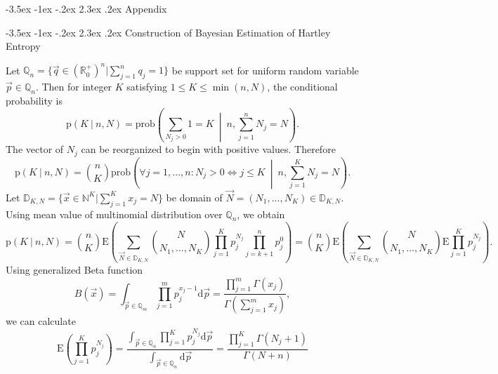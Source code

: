 \documentclass[a4paper,10pt]{article}
\makeatletter
\renewcommand\section{\@startsection {section}{1}{\z@}%
                                   {-3.5ex \@plus -1ex \@minus -.2ex}%
                                   {2.3ex \@plus.2ex}%
                                   {\large\bfseries}}
\renewcommand\subsection{\@startsection {subsection}{1}{\z@}%
                                   {-3.5ex \@plus -1ex \@minus -.2ex}%
                                   {2.3ex \@plus.2ex}%
                                   {\normalsize\bfseries}}
\makeatother
\begin{document}
\begin{appendices}

\section {Appendix}

\subsection {Construction of Bayesian Estimation of Hartley Entropy}

Let $\mathbb{Q}_{n} = \{ \vec{q} \in (\mathbb{R}_{0}^{+})^{n} | \sum_{j=1}^{n}q_{j} = 1 \}$ be support set for uniform random variable $\vec{p} \in \mathbb{Q}_{n}$. Then for integer $K$ satisfying $1 \le K \le \min(n,N)$, the conditional probability is 
\begin{equation} 
\label{eq:probpkn}
\text{p}(K \: | \: n,N) = \text{prob}\left(\sum_{N_{j}>0} 1 = K \: \middle| \: n, \sum_{j=1}^{n}N_{j} = N\right).
\end{equation}
The vector of $N_{j}$ can be reorganized to begin with positive values. Therefore
\begin{equation} 
\label{eq:probbinom}
\text{p}(K \: | \: n,N) = {n \choose K}\text{prob}\left( \forall j=1,...,n : N_{j} > 0 \Leftrightarrow j \le K \: \middle| \: n, \sum_{j=1}^{K}N_{j}=N\right).
\end{equation}
Let $\mathbb{D}_{K,N} = \{ \vec{x} \in \mathbb{N}^K | \sum_{j=1}^{K}x_{j} = N \}$ be domain of $\vec{N} = (N_{1},...,N_{K}) \in \mathbb{D}_{K,N}$. Using mean value of multinomial distribution over $\mathbb{Q}_{n}$, we obtain
\begin{equation} 
\label{eq:probbinomexp}
\text{p}(K \: | \: n,N) = {n \choose K} \text{E}\left(\sum_{\vec{N} \in \mathbb{D}_{K,N}} {N \choose N_{1},...,N_{K}} \prod_{j=1}^{K}p_{j}^{N_{j}} \prod_{j=k+1}^{n}p_{j}^{0} \right) = {n \choose K} \text{E}\left(\sum_{\vec{N} \in \mathbb{D}_{K,N}} {N \choose N_{1},...,N_{K}} \text{E}\prod_{j=1}^{K}p_{j}^{N_{j}}\right).
\end{equation}
Using generalized Beta function
\begin{equation} 
\label{eq:betafce}
B(\vec{x}) = \int_{\vec{p} \in \mathbb{Q}_{m}} \prod_{j=1}^{m} p_{j}^{x_{j}-1} \text{d}\vec{p} = \frac{\prod_{j=1}^{m} \Gamma(x_{j})}{\Gamma(\sum_{j=1}^{m}x_{j})},
\end{equation}
we can calculate
\begin{equation} 
\label{eq:expprod}
\text{E}(\prod_{j=1}^{K}p_{j}^{N_{j}}) = \frac{\int_{\vec{p} \in \mathbb{Q}_{n}} \prod_{j=1}^{K} p_{j}^{N_{j}} \text{d}\vec{p}}{\int_{\vec{p} \in \mathbb{Q}_{n}} \text{d}\vec{p}} = \frac{\prod_{j=1}^{K}\Gamma(N_{j}+1)}{\Gamma(N+n)}

\end{equation}
\end{appendices}
\end{document}
